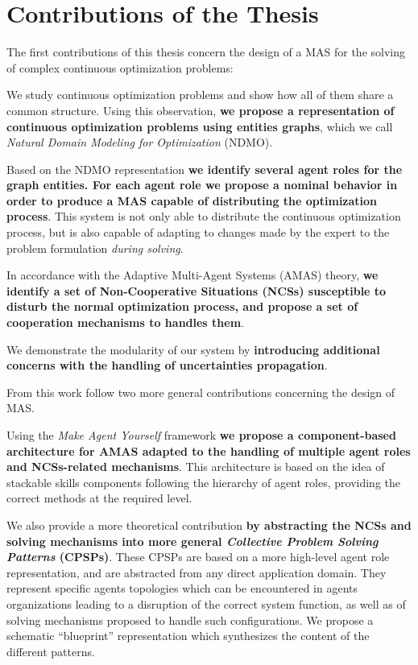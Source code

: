 \section*{Contributions of the Thesis}

The first contributions of this thesis concern the design of a MAS for the solving of complex continuous optimization problems:

We study continuous optimization problems and show how all of them share a common structure. Using this observation, \textbf{we propose a representation of continuous optimization problems using entities graphs}, which we call \emph{Natural Domain Modeling for Optimization} (NDMO).

Based on the NDMO representation \textbf{we identify several agent roles for the graph entities. For each agent role we propose a nominal behavior in order to produce a MAS capable of distributing the optimization process}. This system is not only able to distribute the continuous optimization process, but is also capable of adapting to changes made by the expert to the problem formulation \emph{during solving}.

In accordance with the Adaptive Multi-Agent Systems (AMAS) theory, \textbf{we identify a set of Non-Cooperative Situations (NCSs) susceptible to disturb the normal optimization process, and propose a set of cooperation mechanisms to handles them}.

We demonstrate the modularity of our system by \textbf{introducing additional concerns with the handling of uncertainties propagation}.

From this work follow two more general contributions concerning the design of MAS.

Using the \emph{Make Agent Yourself} framework \textbf{we propose a component-based architecture for AMAS adapted to the handling of multiple agent roles and NCSs-related mechanisms}. This architecture is based on the idea of stackable skills components following the hierarchy of agent roles, providing the correct methods at the required level.

We also provide a more theoretical contribution \textbf{by abstracting the NCSs and solving mechanisms into more general \textit{Collective Problem Solving Patterns} (CPSPs)}. These CPSPs are based on a more high-level agent role representation, and are abstracted from any direct application domain. They represent specific agents topologies which can be encountered in agents organizations leading to a disruption of the correct system function, as well as of solving mechanisms proposed to handle such configurations. We propose a schematic \enquote{blueprint} representation which synthesizes the content of the different patterns.

